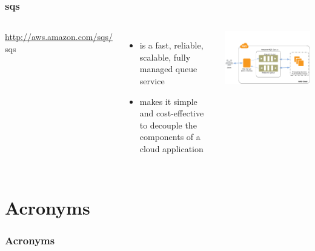 \documentclass{beamer}
\begin{document}
\begin{frame}
\frametitle[\gls{sqs}]{\acrfull{sqs}}

\begin{columns}
\url{http://aws.amazon.com/sqs/}
\gls{sqs} 
\begin{itemize}
 \item is a fast, reliable, scalable, fully managed queue service
  \item makes it simple and cost-effective to decouple the components of a cloud application
\end{itemize}
\includegraphics[width=1.0 \textwidth]{sqs-as-workflow.png}
\end{columns}
\end{frame}
\section*{Acronyms}
\begin{frame}
\frametitle[Acronyms]{Acronyms}
\glsaddall
\printglossary[type=\acronymtype] %
\end{frame}
\end{document}
